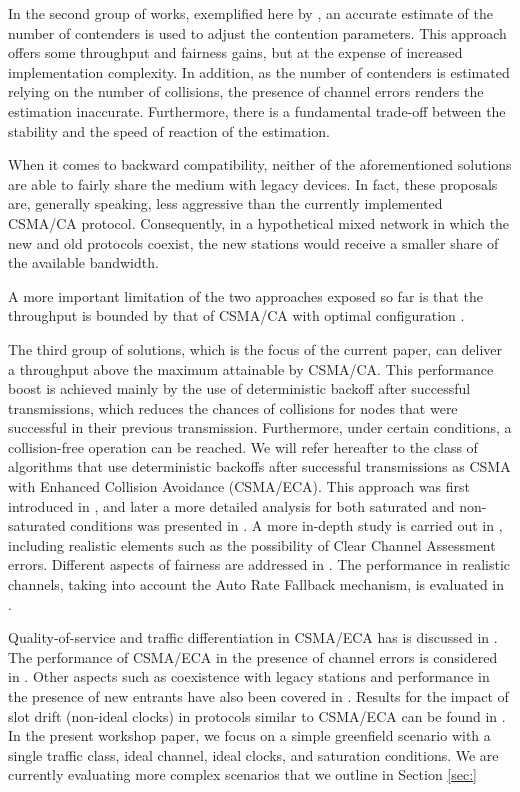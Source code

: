 \documentclass[conference]{IEEEtran}
\begin{document}
In the second group of works, exemplified here by \cite{cali2000dti,lopez-toledo2006aoi}, an accurate estimate of the number of contenders is used to adjust the contention parameters. This approach offers some throughput and fairness gains, but at the expense of increased implementation complexity. In addition, as the number of contenders is estimated relying on the number of collisions, the presence of channel errors renders the estimation inaccurate.
Furthermore, there is a fundamental trade-off between the stability and the speed of reaction of the estimation.

When it comes to backward compatibility, neither of the aforementioned solutions are able to fairly share the medium with legacy devices.
In fact, these proposals are, generally speaking, less aggressive than the currently implemented CSMA/CA protocol. Consequently, in a hypothetical mixed network in which the new and old protocols coexist, the new stations would receive a smaller share of the available bandwidth.

A more important limitation of the two approaches exposed so far is that the throughput is bounded by that of CSMA/CA with optimal configuration \cite{cali2000dti,bianchi2000pai}.

The third group of solutions, which is the focus of the current paper, can deliver a throughput above the maximum attainable by CSMA/CA. This performance boost is achieved mainly by the use of deterministic backoff after successful transmissions, which reduces the chances of collisions for nodes that were successful in their previous transmission. Furthermore, under certain conditions, a collision-free operation can be reached. {We will refer hereafter to the class of algorithms that use deterministic backoffs after successful transmissions as CSMA with Enhanced Collision Avoidance (CSMA/ECA).} This approach was first introduced in \cite{barcelo2008lba}, and later a more detailed analysis for both saturated and non-saturated conditions was presented in \cite{bellalta2009vtc}.
A more in-depth study is carried out in \cite{he2009srb}, including realistic elements such as the possibility of Clear Channel Assessment errors.
Different aspects of fairness are addressed in \cite{he2009srb,barcelo2010fcc,fang2011dlm}.
The performance in realistic channels, taking into account the Auto Rate Fallback mechanism, is evaluated in \cite{martorell2012pec,martorell2012tfl}.

Quality-of-service and traffic differentiation in CSMA/ECA has is discussed in \cite{barcelo2009tpc, he2009srb}.
The performance of CSMA/ECA in the presence of channel errors is considered in \cite{he2009srb, barcelo2010fcc, fang2011dlm, barcelo2012mdc}. 
Other aspects such as coexistence with legacy stations and performance in the presence of new entrants have also been covered in \cite{he2009srb, barcelo2010fcc, fang2011dlm}.
Results for the impact of slot drift (non-ideal clocks) in protocols similar to CSMA/ECA can be found in \cite{gong2012asd}.
In the present workshop paper, we focus on a simple greenfield scenario with a single traffic class, ideal channel, ideal clocks, and saturation conditions.
We are currently evaluating more complex scenarios that we outline in Section \ref{sec:}
\end{document}
